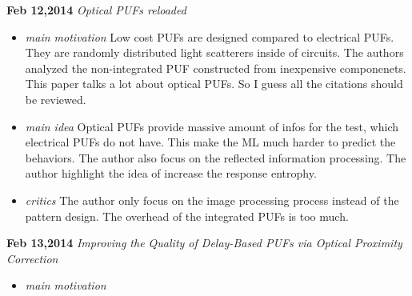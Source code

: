 \documentclass[]{article}
\begin{document}
\noindent \textbf{Feb 12,2014}
\textit{Optical PUFs reloaded}
\indent		\begin{itemize}
        \item \textit{main motivation}
            Low cost PUFs are designed compared to electrical PUFs. They are
            randomly distributed light scatterers inside of circuits. The
            authors analyzed the non-integrated PUF constructed from inexpensive
            componenets. This paper talks a lot about optical PUFs. So I guess
            all the citations should be reviewed.
          
        \item \textit{main idea}
            Optical PUFs provide massive amount of infos for the test, which
            electrical PUFs do not have. This make the ML much harder to predict
            the behaviors. The author also focus on the reflected information
            processing. The author highlight the idea of increase the response
            entrophy.

        \item \textit{critics}
            The author only focus on the image processing process instead of the
            pattern design. The overhead of the integrated PUFs is too much.
            
        \end{itemize}

\noindent \textbf{Feb 13,2014}
\textit{Improving the Quality of Delay-Based PUFs via Optical Proximity
        Correction}
\indent     \begin{itemize}
        \item \textit{main motivation}
        \end{itemize}
\end{document}
